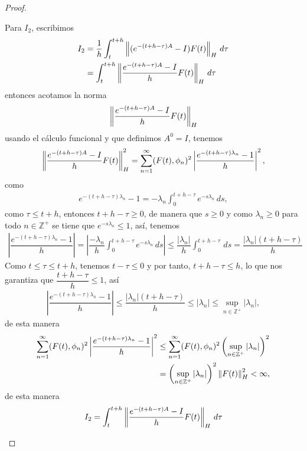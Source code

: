 \begin{proof}
\begin{enumerate}
    Para $I_2$, escribimos
    \begin{align*}
        I_2&=\dfrac{1}{h}\int_{t}^{t+h}\left\|(e^{-(t+h-\tau)A}-I)F(t)\right\|_H\, d\tau\\
        &=\int_{t}^{t+h}\left\|\dfrac{e^{-(t+h-\tau)A}-I}{h}F(t)\right\|_H\, d\tau
    \end{align*}
    entonces acotamos la norma
    \begin{align*}
        \left\|\dfrac{e^{-(t+h-\tau)A}-I}{h}F(t)\right\|_H
    \end{align*}
    usando el cálculo funcional y que definimos $A^0=I$, tenemos
    \begin{align*}
        \left\|\dfrac{e^{-(t+h-\tau)A}-I}{h}F(t)\right\|_H^2=\sum_{n=1}^\infty(F(t),\phi_n)^2\left|\dfrac{e^{-(t+h-\tau)\lambda_n}-1}{h}\right|^2,
    \end{align*}
    como
    \begin{align*}
        e^{-(t+h-\tau)\lambda_n}-1=-\lambda_n\int_{0}^{t+h-\tau}e^{-s\lambda_n}\, ds,
    \end{align*}
    como $\tau\leq t+h$, entonces $t+h-\tau\geq 0$, de manera que $s\geq 0$ y como $\lambda_n\geq 0$ para todo $n \in \mathbb{Z}^+$ se tiene que $e^{-s\lambda_n}\leq 1$, así, tenemos
    \begin{align*}
        \left|\dfrac{e^{-(t+h-\tau)\lambda_n}-1}{h}\right|=\left|\dfrac{-\lambda_n}{h}\int_{0}^{t+h-\tau}e^{-s\lambda_n}\, ds\right|\leq \dfrac{|\lambda_n|}{h}\int_{0}^{t+h-\tau}\, ds=\dfrac{|\lambda_n|(t+h-\tau)}{h}
    \end{align*}
    Como $t\leq \tau\leq t+h$, tenemos $t-\tau\leq 0$ y por tanto, $t+h-\tau\leq h$, lo que nos garantiza que $\dfrac{t+h-\tau}{h}\leq 1$, así
    \begin{align*}
        \left|\dfrac{e^{-(t+h-\tau)\lambda_n}-1}{h}\right|\leq \dfrac{|\lambda_n|(t+h-\tau)}{h}\leq |\lambda_n|\leq \sup_{n\in \mathbb{Z}^+}|\lambda_n|,
    \end{align*}
    de esta manera
    \begin{align*}
        \sum_{n=1}^\infty(F(t),\phi_n)^2\left|\dfrac{e^{-(t+h-\tau)\lambda_n}-1}{h}\right|^2&\leq \sum_{n=1}^\infty(F(t),\phi_n)^2\left(\sup_{n\in \mathbb{Z}^+}|\lambda_n|\right)^2\\
        &=\left(\sup_{n\in \mathbb{Z}^+}|\lambda_n|\right)^2\left\|F(t)\right\|_H^2<\infty,
    \end{align*}
    de esta manera
    \begin{align*}
        I_2&=\int_{t}^{t+h}\norm{\dfrac{e^{-(t+h-\tau)A}-I}{h}F(t)}_H\, d\tau\\

\end{align*}
\end{enumerate}
\end{proof}
